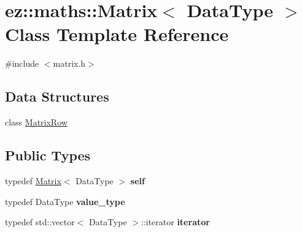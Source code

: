 \hypertarget{classez_1_1maths_1_1Matrix}{}\section{ez\+:\+:maths\+:\+:Matrix$<$ Data\+Type $>$ Class Template Reference}
\label{classez_1_1maths_1_1Matrix}


{\ttfamily \#include $<$matrix.\+h$>$}

\subsection*{Data Structures}
\begin{DoxyCompactItemize}
\item 
class \hyperlink{classez_1_1maths_1_1Matrix_1_1MatrixRow}{Matrix\+Row}
\end{DoxyCompactItemize}
\subsection*{Public Types}
\begin{DoxyCompactItemize}
\item 
\mbox{\label{classez_1_1maths_1_1Matrix_afe4c29ded12f4b2c40795da3d6580c46}} 
typedef \hyperlink{classez_1_1maths_1_1Matrix}{Matrix}$<$ Data\+Type $>$ {\bfseries self}
\item 
\mbox{\label{classez_1_1maths_1_1Matrix_aa699b296a08c9251239f307cd42f4b3d}} 
typedef Data\+Type {\bfseries value\+\_\+type}
\item 
\mbox{\label{classez_1_1maths_1_1Matrix_ae6a09a08df99df89846f5026087f3d2b}} 
typedef std\+::vector$<$ Data\+Type $>$\+::iterator {\bfseries iterator}
\end{DoxyCompactItemize}
